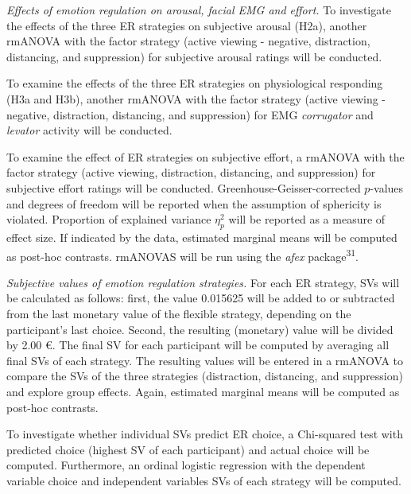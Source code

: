 \documentclass[
  english,
  man,floatsintext]{apa6}
\begin{document}
\emph{Effects of emotion regulation on arousal, facial EMG and effort.}
To investigate the effects of the three ER strategies on subjective arousal (H2a), another rmANOVA with the factor strategy (active viewing - negative, distraction, distancing, and suppression) for subjective arousal ratings will be conducted.

To examine the effects of the three ER strategies on physiological responding (H3a and H3b), another rmANOVA with the factor strategy (active viewing - negative, distraction, distancing, and suppression) for EMG \emph{corrugator} and \emph{levator} activity will be conducted.

To examine the effect of ER strategies on subjective effort, a rmANOVA with the factor strategy (active viewing, distraction, distancing, and suppression) for subjective effort ratings will be conducted.
Greenhouse-Geisser-corrected \(p\)-values and degrees of freedom will be reported when the assumption of sphericity is violated.
Proportion of explained variance \(\eta_{p}^{2}\) will be reported as a measure of effect size.
If indicated by the data, estimated marginal means will be computed as post-hoc contrasts.
rmANOVAS will be run using the \emph{afex} package\textsuperscript{31}.

\emph{Subjective values of emotion regulation strategies.} For each ER strategy, SVs will be calculated as follows: first, the value 0.015625 will be added to or subtracted from the last monetary value of the flexible strategy, depending on the participant's last choice.
Second, the resulting (monetary) value will be divided by 2.00 €.
The final SV for each participant will be computed by averaging all final SVs of each strategy.
The resulting values will be entered in a rmANOVA to compare the SVs of the three strategies (distraction, distancing, and suppression) and explore group effects.
Again, estimated marginal means will be computed as post-hoc contrasts.

To investigate whether individual SVs predict ER choice, a Chi-squared test with predicted choice (highest SV of each participant) and actual choice will be computed.
Furthermore, an ordinal logistic regression with the dependent variable choice and independent variables SVs of each strategy will be computed.
\end{document}
